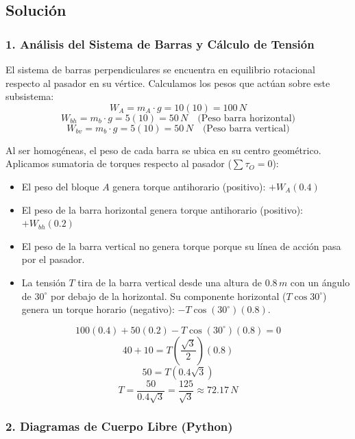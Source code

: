 \documentclass[12pt, a4paper]{article}
\begin{document}
\subsection*{Solución}

\subsubsection*{1. Análisis del Sistema de Barras y Cálculo de Tensión}
El sistema de barras perpendiculares se encuentra en equilibrio rotacional respecto al pasador en su vértice. Calculamos los pesos que actúan sobre este subsistema:
$$W_A = m_A \cdot g = 10(10) = 100 \, \si{N}$$
$$W_{bh} = m_b \cdot g = 5(10) = 50 \, \si{N} \quad \text{(Peso barra horizontal)}$$
$$W_{bv} = m_b \cdot g = 5(10) = 50 \, \si{N} \quad \text{(Peso barra vertical)}$$

Al ser homogéneas, el peso de cada barra se ubica en su centro geométrico.
Aplicamos sumatoria de torques respecto al pasador ($\sum \tau_O = 0$):
\begin{itemize}
    \item El peso del bloque $A$ genera torque antihorario (positivo): $+ W_A (0.4)$
    \item El peso de la barra horizontal genera torque antihorario (positivo): $+ W_{bh} (0.2)$
    \item El peso de la barra vertical no genera torque porque su línea de acción pasa por el pasador.
    \item La tensión $T$ tira de la barra vertical desde una altura de $0.8 \, \si{m}$ con un ángulo de $30^\circ$ por debajo de la horizontal. Su componente horizontal ($T \cos 30^\circ$) genera un torque horario (negativo): $- T \cos(30^\circ)(0.8)$.
\end{itemize}

$$100(0.4) + 50(0.2) - T \cos(30^\circ)(0.8) = 0$$
$$40 + 10 = T \left( \frac{\sqrt{3}}{2} \right) (0.8)$$
$$50 = T (0.4\sqrt{3})$$
$$T = \frac{50}{0.4\sqrt{3}} = \frac{125}{\sqrt{3}} \approx 72.17 \, \si{N}$$

\subsubsection*{2. Diagramas de Cuerpo Libre (Python)}
\end{document}
